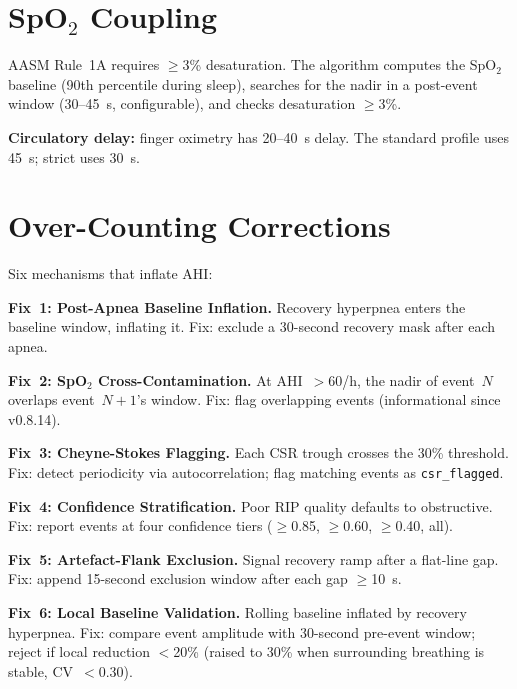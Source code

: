 \documentclass[11pt,a4paper]{article}
\begin{document}
\section{SpO\texorpdfstring{$_2$}{2} Coupling}

AASM Rule~1A requires $\geq$3\% desaturation. The algorithm computes
the SpO$_2$ baseline (90th percentile during sleep), searches for the
nadir in a post-event window (30--45~s, configurable), and checks
desaturation $\geq$3\%.

\textbf{Circulatory delay:} finger oximetry has 20--40~s delay. The
standard profile uses 45~s; strict uses 30~s.

\section{Over-Counting Corrections}
\label{sec:overcounting}

Six mechanisms that inflate AHI:

\textbf{Fix~1: Post-Apnea Baseline Inflation.}
Recovery hyperpnea enters the baseline window, inflating it. Fix:
exclude a 30-second recovery mask after each apnea.

\textbf{Fix~2: SpO$_2$ Cross-Contamination.}
At AHI~$>$60/h, the nadir of event~$N$ overlaps event~$N+1$'s window.
Fix: flag overlapping events (informational since v0.8.14).

\textbf{Fix~3: Cheyne-Stokes Flagging.}
Each CSR trough crosses the 30\% threshold. Fix: detect periodicity
via autocorrelation; flag matching events as \texttt{csr\_flagged}.

\textbf{Fix~4: Confidence Stratification.}
Poor RIP quality defaults to obstructive. Fix: report events at four
confidence tiers ($\geq$0.85, $\geq$0.60, $\geq$0.40, all).

\textbf{Fix~5: Artefact-Flank Exclusion.}
Signal recovery ramp after a flat-line gap. Fix: append 15-second
exclusion window after each gap $\geq$10~s.

\textbf{Fix~6: Local Baseline Validation.}
Rolling baseline inflated by recovery hyperpnea. Fix: compare event
amplitude with 30-second pre-event window; reject if local reduction
$<$20\% (raised to 30\% when surrounding breathing is stable,
CV~$<$0.30).
\end{document}
